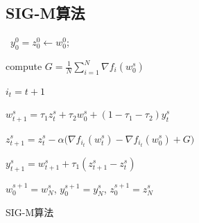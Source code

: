 \subsection{SIG-M算法}
\frame
{
\begin{algorithm}[H]
  \SetAlgoLined
   \
  $y_0^0 = z_0^0 \leftarrow w_0^0$; \

  {
   compute $G = \frac{1}{N} \sum_{i=1}^{N} \nabla f_i(w_0^s)$ \

   {
    $i_t = t+1$ \


    $w_{t+1}^{s} = \tau_1 z_t^s + \tau_2 w_0^s + (1 - \tau_1 - \tau_2) y_t^s$ \

    $z_{t+1}^s = z_t^s - \alpha \big(\nabla f_{i_t}(w_t^s) - \nabla f_{i_t}(w_0^s) + G \big)$ \

    $y_{t+1}^s = w_{t+1}^s + \tau_1 (z_{t+1}^s - z_t^s)$ \

   }
   $w_0^{s+1} = w_N^s$, $y_0^{s+1} = y_N^s$, $z_0^{s+1} = z_N^s$ \

  }
  \caption{SIG-M算法}
\end{algorithm}
}



